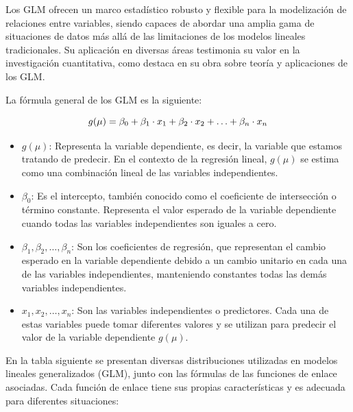 \documentclass[
  11pt,
  bookmarksnumbered]{article}
\begin{document}
Los GLM ofrecen un marco estadístico robusto y flexible para la modelización de relaciones entre variables, siendo capaces de abordar una amplia gama de situaciones de datos más allá de las limitaciones de los modelos lineales tradicionales.
Su aplicación en diversas áreas testimonia su valor en la investigación cuantitativa, como destaca \textcite{mccullagh1989generalized} en su obra sobre teoría y aplicaciones de los GLM.

La fórmula general de los GLM es la siguiente: 

\begin{equation}
\large g(\mu) = \beta_0 + \beta_1 \cdot x_1 + \beta_2 \cdot x_2 + \ldots + \beta_n \cdot x_n\end{equation}

\begin{itemize}
\item
  \(g(\mu)\): Representa la variable dependiente, es decir, la variable que estamos tratando de predecir.
  En el contexto de la regresión lineal, \(g(\mu)\) se estima como una combinación lineal de las variables independientes.
\item
  \(\beta_0\): Es el intercepto, también conocido como el coeficiente de intersección o término constante.
  Representa el valor esperado de la variable dependiente cuando todas las variables independientes son iguales a cero.
\item
  \(\beta_1, \beta_2, \ldots, \beta_n\): Son los coeficientes de regresión, que representan el cambio esperado en la variable dependiente debido a un cambio unitario en cada una de las variables independientes, manteniendo constantes todas las demás variables independientes.
\item
  \(x_1, x_2, \ldots, x_n\): Son las variables independientes o predictores.
  Cada una de estas variables puede tomar diferentes valores y se utilizan para predecir el valor de la variable dependiente \(g(\mu)\).
\end{itemize}

En la tabla siguiente se presentan diversas distribuciones utilizadas en modelos lineales generalizados (GLM), junto con las fórmulas de las funciones de enlace asociadas.
Cada función de enlace tiene sus propias características y es adecuada para diferentes situaciones:
\end{document}

